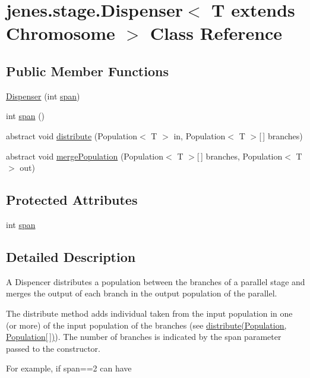 \hypertarget{classjenes_1_1stage_1_1_dispenser_3_01_t_01extends_01_chromosome_01_4}{\section{jenes.\-stage.\-Dispenser$<$ T extends Chromosome $>$ Class Reference}
\label{classjenes_1_1stage_1_1_dispenser_3_01_t_01extends_01_chromosome_01_4}
}
\subsection*{Public Member Functions}
\begin{DoxyCompactItemize}
\item 
\hyperlink{classjenes_1_1stage_1_1_dispenser_3_01_t_01extends_01_chromosome_01_4_a8972dc3bcea956122cc623784a833bcf}{Dispenser} (int \hyperlink{classjenes_1_1stage_1_1_dispenser_3_01_t_01extends_01_chromosome_01_4_a8f9bc0997e0536729db0c55bc9e240a5}{span})
\item 
int \hyperlink{classjenes_1_1stage_1_1_dispenser_3_01_t_01extends_01_chromosome_01_4_a6ece937f3d7564424f6367e96e1b21c7}{span} ()
\item 
abstract void \hyperlink{classjenes_1_1stage_1_1_dispenser_3_01_t_01extends_01_chromosome_01_4_ae9eb1e3be8a72e70e2bc75c53f31265b}{distribute} (Population$<$ T $>$ in, Population$<$ T $>$\mbox{[}$\,$\mbox{]} branches)
\item 
abstract void \hyperlink{classjenes_1_1stage_1_1_dispenser_3_01_t_01extends_01_chromosome_01_4_ae35fcd8e2c1ecf6c9069107122b8a894}{merge\-Population} (Population$<$ T $>$\mbox{[}$\,$\mbox{]} branches, Population$<$ T $>$ out)
\end{DoxyCompactItemize}
\subsection*{Protected Attributes}
\begin{DoxyCompactItemize}
\item 
int \hyperlink{classjenes_1_1stage_1_1_dispenser_3_01_t_01extends_01_chromosome_01_4_a8f9bc0997e0536729db0c55bc9e240a5}{span}
\end{DoxyCompactItemize}


\subsection{Detailed Description}
A Dispencer distributes a population between the branches of a parallel stage and merges the output of each branch in the output population of the parallel.\par
 \par
 The distribute method adds individual taken from the input population in one (or more) of the input population of the branches (see \hyperlink{}{distribute(\-Population, Population\mbox{[}$\,$\mbox{]})}). The number of branches is indicated by the span parameter passed to the constructor.\par
 \par
 For example, if span==2 can have\par
 

